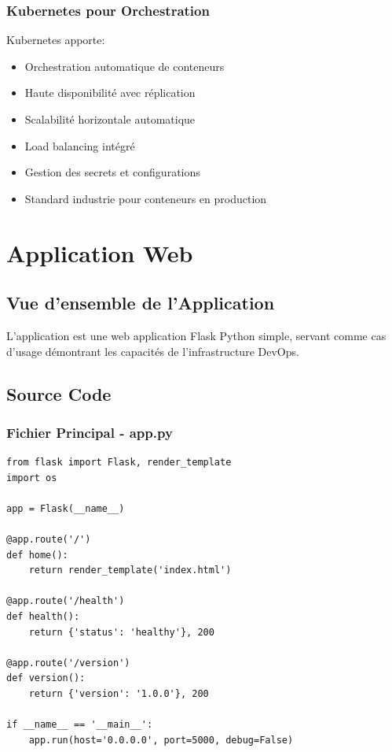 \documentclass[12pt,a4paper]{report}
\begin{document}
\subsection{Kubernetes pour Orchestration}

Kubernetes apporte:
\begin{itemize}
    \item Orchestration automatique de conteneurs
    \item Haute disponibilité avec réplication
    \item Scalabilité horizontale automatique
    \item Load balancing intégré
    \item Gestion des secrets et configurations
    \item Standard industrie pour conteneurs en production
\end{itemize}

\newpage

\chapter{Application Web}

\section{Vue d'ensemble de l'Application}

L'application est une web application Flask Python simple, servant comme cas d'usage démontrant les capacités de l'infrastructure DevOps.

\section{Source Code}

\subsection{Fichier Principal - app.py}

\lstset{language=python}
\begin{lstlisting}
from flask import Flask, render_template
import os

app = Flask(__name__)

@app.route('/')
def home():
    return render_template('index.html')

@app.route('/health')
def health():
    return {'status': 'healthy'}, 200

@app.route('/version')
def version():
    return {'version': '1.0.0'}, 200

if __name__ == '__main__':
    app.run(host='0.0.0.0', port=5000, debug=False)
\end{lstlisting}
\end{document}
